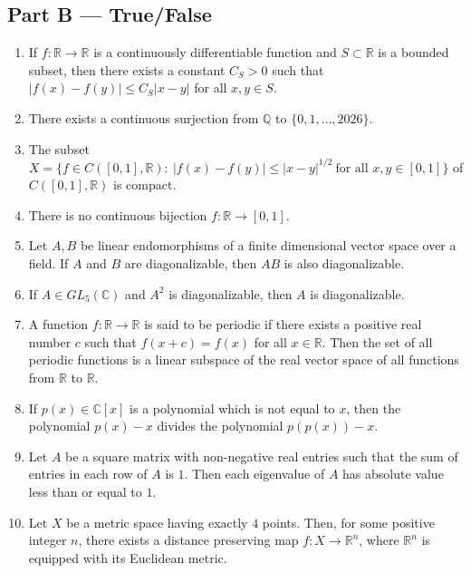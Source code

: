 \documentclass[11pt, a4paper]{article}
\begin{document}
\subsection*{Part B --- True/False}
\begin{enumerate}[resume]
\item If $f:\mathbb{R}\to\mathbb{R}$ is a continuously differentiable function and $S\subset\mathbb{R}$ is a bounded subset, then there exists a constant $C_S>0$ such that $|f(x)-f(y)|\le C_S|x-y|$ for all $x,y\in S$.

\item There exists a continuous surjection from $\mathbb{Q}$ to $\{0,1,\ldots,2026\}$.

\item The subset $X=\{f\in C([0,1],\mathbb{R}):\ |f(x)-f(y)|\le|x-y|^{1/2}\ \text{for all } x,y\in[0,1]\}$ of $C([0,1],\mathbb{R})$ is compact.

\item There is no continuous bijection $f:\mathbb{R}\to[0,1]$.

\item Let $A,B$ be linear endomorphisms of a finite dimensional vector space over a field. If $A$ and $B$ are diagonalizable, then $AB$ is also diagonalizable.

\item If $A\in GL_5(\mathbb{C})$ and $A^2$ is diagonalizable, then $A$ is diagonalizable.

\item A function $f:\mathbb{R}\to\mathbb{R}$ is said to be periodic if there exists a positive real number $c$ such that $f(x+c)=f(x)$ for all $x\in\mathbb{R}$. Then the set of all periodic functions is a linear subspace of the real vector space of all functions from $\mathbb{R}$ to $\mathbb{R}$.

\item If $p(x)\in\mathbb{C}[x]$ is a polynomial which is not equal to $x$, then the polynomial $p(x)-x$ divides the polynomial $p(p(x))-x$.

\item Let $A$ be a square matrix with non-negative real entries such that the sum of entries in each row of $A$ is $1$. Then each eigenvalue of $A$ has absolute value less than or equal to $1$.

\item Let $X$ be a metric space having exactly $4$ points. Then, for some positive integer $n$, there exists a distance preserving map $f:X\to\mathbb{R}^n$, where $\mathbb{R}^n$ is equipped with its Euclidean metric.


\end{enumerate}
\end{document}
